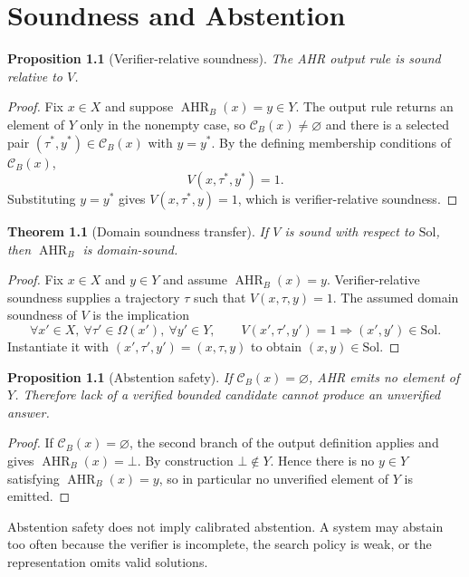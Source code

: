 \documentclass[11pt,oneside]{book}
\newtheorem{theorem}[definition]{Theorem}
\newtheorem{proposition}[definition]{Proposition}
\theoremstyle{remark}
\newcommand{\AHR}{\operatorname{AHR}}
\newcommand{\Sol}{\mathrm{Sol}}
\newcommand{\Om}{\Omega}
\newcommand{\cB}{\mathcal C_B}
\begin{document}
\chapter{Soundness and Abstention}

\begin{proposition}[Verifier-relative soundness]
The AHR output rule is sound relative to $V$.
\end{proposition}

\begin{proof}
Fix $x\in X$ and suppose $\AHR_B(x)=y\in Y$. The output rule returns an
element of $Y$ only in the nonempty case, so $\cB(x)\ne\varnothing$ and there
is a selected pair $(\tau^*,y^*)\in\cB(x)$ with $y=y^*$. By the defining
membership conditions of $\cB(x)$,
\[
V(x,\tau^*,y^*)=1.
\]
Substituting $y=y^*$ gives $V(x,\tau^*,y)=1$, which is verifier-relative
soundness.
\end{proof}

\begin{theorem}[Domain soundness transfer]
If $V$ is sound with respect to $\Sol$, then $\AHR_B$ is domain-sound.
\end{theorem}

\begin{proof}
Fix $x\in X$ and $y\in Y$ and assume $\AHR_B(x)=y$. Verifier-relative
soundness supplies a trajectory $\tau$ such that $V(x,\tau,y)=1$. The assumed
domain soundness of $V$ is the implication
\[
\forall x'\in X,\ \forall\tau'\in\Om(x'),\ \forall y'\in Y,\qquad
V(x',\tau',y')=1\Longrightarrow(x',y')\in\Sol.
\]
Instantiate it with $(x',\tau',y')=(x,\tau,y)$ to obtain
$(x,y)\in\Sol$.
\end{proof}

\begin{proposition}[Abstention safety]
If $\cB(x)=\varnothing$, AHR emits no element of $Y$. Therefore lack of a verified bounded candidate cannot produce an unverified answer.
\end{proposition}

\begin{proof}
If $\cB(x)=\varnothing$, the second branch of the output definition applies
and gives $\AHR_B(x)=\bot$. By construction $\bot\notin Y$. Hence there is no
$y\in Y$ satisfying $\AHR_B(x)=y$, so in particular no unverified element of
$Y$ is emitted.
\end{proof}

Abstention safety does not imply calibrated abstention. A system may abstain too often because the verifier is incomplete, the search policy is weak, or the representation omits valid solutions.
\end{document}
